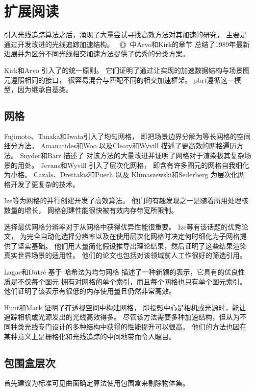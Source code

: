 \section{扩展阅读}\label{sec:扩展阅读04}
引入光线追踪算法之后，涌现了大量尝试寻找高效方法对其加速的研究，
主要是通过开发改进的光线追踪加速结构。
《》\citep{10.5555/94788}中Arvo和Kirk的章节
总结了1989年最新进展并为区分不同光线相交加速方法提供了优秀的分类方案。

Kirk和Arvo \parencite*{Kirk88theray}引入了的统一原则。
它们证明了通过让实现的加速数据结构与场景图元遵照相同的接口，
很容易混合与匹配不同的相交加速框架。
pbrt遵循这一模型，因为继承自基类。

\subsection{网格}\label{sub:网格}
Fujimoto、Tanaka和Iwata\parencite*{4056861}引入了均匀网格，
即把场景边界分解为等长网格的空间细分方法。
Amanatides和Woo \parencite*{10.2312:egtp.19871000}
以及Cleary和Wyvill \parencite*{Cleary1988}描述了更高效的网格遍历方法。
Snyder和Barr \parencite*{10.1145/37401.37417}描述了
对该方法的大量改进并证明了网格对于渲染极其复杂场景的用处。
Jevans和Wyvill \parencite*{Jevans1989:23}引入了层次化网格，
即含有许多图元的网格自我细化为小格。
Cazals、Drettakis和Puech \parencite*{cazals1995filtering}以及
Klimaszewski和Sederberg \parencite*{576857}为层次化网格开发了更复杂的技术。

Ize等\parencite*{4061545}为网格的并行创建开发了高效算法。
他们的有趣发现之一是随着所用处理核数量的增长，
网格创建性能很快被有效内存带宽所限制。

选择最优网格分辨率对于从网格中获得优异性能很重要。
Ize等\parencite*{4342587}有该话题的优秀论文，
为完全自动化选择分辨率以及在使用层次化网格时决定何时细化为子网格提供了坚实基础。
他们用大量简化假设推导出理论结果，然后证明了这些结果渲染真实世界场景的适用性。
他们的论文也包括对该领域前人工作很好的筛选引用。

Lagae和Dutré \parencite*{lagae2008compact}基于
哈希法为均匀网格
描述了一种新颖的表示，它具有的优良性质是不仅每个图元
拥有对网格的单个索引，而且每个网格也只有单个图元索引。
他们证明了该表示有很低的内存使用量且仍然非常高效。

Hunt和Mark \parencite*{4634613}证明了在透视空间中构建网格，
即投影中心是相机或光源时，能让追踪相机或光源发出的光线高效得多。
尽管该方法需要多种加速结构，但从为不同种类光线专门设计的多种结构中获得的性能提升可以很高。
他们的方法也因在某种意义上是栅格化和光线追踪的中间地带而令人瞩目。

\subsection{包围盒层次}\label{sub:包围盒层次}
\citet{10.1145/360349.360354}首先建议为标准可见曲面确定算法使用包围盒来剔除物体集。

